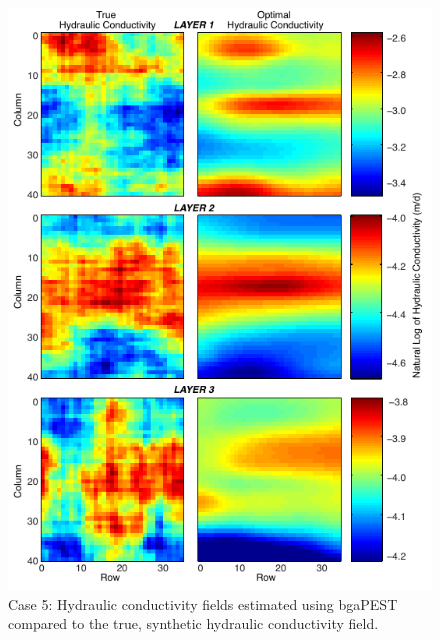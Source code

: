 \documentclass[11pt,oneside,onecolumn]{usgsreport}
\begin{document}
\begin{appendix}
\begin{figure}[!t]
\begin{center}\includegraphics{figures/3KL_case5}\end{center}

\caption{\label{fig:3LK_case5}Case 5: Hydraulic conductivity fields estimated
using bgaPEST compared to the true, synthetic hydraulic conductivity
field.}
\end{figure}



\end{appendix}
\end{document}
